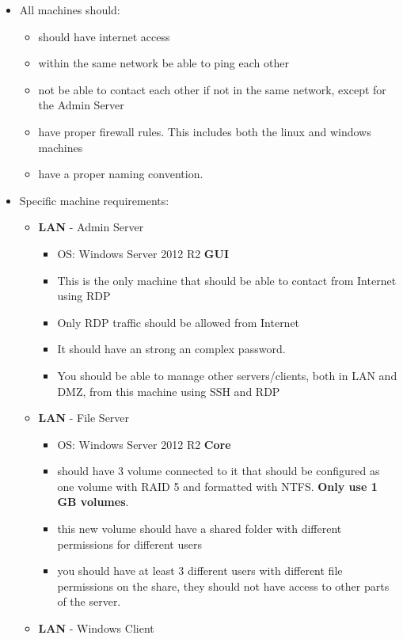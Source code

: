 \documentclass[paper=a4, fontsize=11pt]{report} %
\begin{document}
\begin{itemize}
    \item All machines should:
    \begin{itemize}
		\item should have internet access
		\item within the same network be able to ping each other
		\item not be able to contact each other if not in the same network, except for the Admin Server
        \item have proper firewall rules. This includes both the linux and windows machines
    	\item have a proper naming convention.
    \end{itemize}
	\item Specific machine requirements:
    \begin{itemize}
        \item \textbf{LAN} - Admin Server
        \begin{itemize}
			\item OS: Windows Server 2012 R2 \textbf{GUI}
			\item This is the only machine that should be able to contact from Internet using RDP
			\item Only RDP traffic should be allowed from Internet
        	\item It should have an strong an complex password.
        	\item You should be able to manage other servers/clients, both in LAN and DMZ, from this machine using SSH and RDP
        \end{itemize}        
        \item \textbf{LAN} - File Server
        \begin{itemize}
			\item OS: Windows Server 2012 R2 \textbf{Core}
			\item should have 3 volume connected to it that should be configured as one volume with RAID 5 and formatted with NTFS. \textbf{Only use 1 GB volumes}.
			\item this new volume should have a shared folder with different permissions for different users
			\item you should have at least 3 different users with different file permissions on the share, they should not have access to other parts of the server.
        \end{itemize}
        \item \textbf{LAN} - Windows Client

\end{itemize}
\end{itemize}
\end{document}
